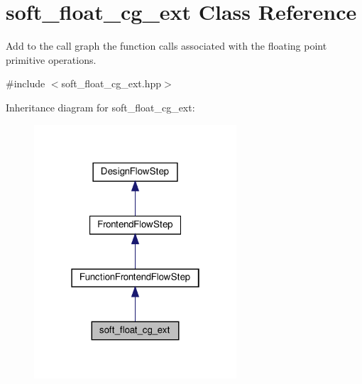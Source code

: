 \hypertarget{classsoft__float__cg__ext}{}\section{soft\+\_\+float\+\_\+cg\+\_\+ext Class Reference}
\label{classsoft__float__cg__ext}


Add to the call graph the function calls associated with the floating point primitive operations.  




{\ttfamily \#include $<$soft\+\_\+float\+\_\+cg\+\_\+ext.\+hpp$>$}



Inheritance diagram for soft\+\_\+float\+\_\+cg\+\_\+ext\+:
\nopagebreak
\begin{figure}[H]
\begin{center}
\leavevmode
\includegraphics[width=214pt]{d3/d3d/classsoft__float__cg__ext__inherit__graph}
\end{center}
\end{figure}


